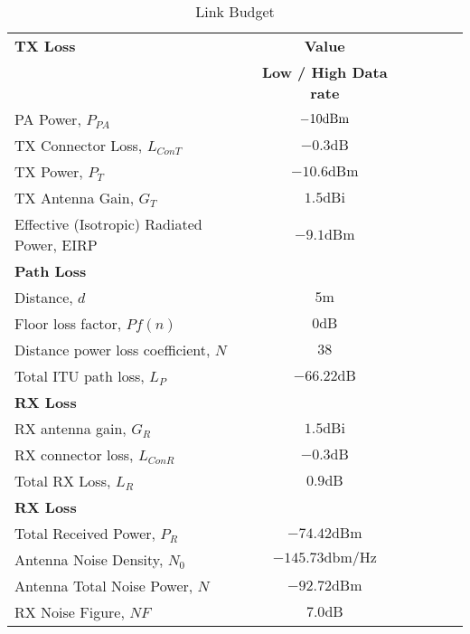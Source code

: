\begin{table}[htbp]
  \centering
  \caption{Link Budget}
    \begin{tabular}{lccccr}
    \rowcolor[rgb]{ 0,  0,  0} \textcolor[rgb]{ 1,  1,  1}{\textbf{TX Loss}}	& \textcolor[rgb]{ 1,  1,  1}{\textbf{Value}} 		\\
    \rowcolor[rgb]{ 0,  0,  0} \textcolor[rgb]{ 1,  1,  1}{} & \textcolor[rgb]{ 1,  1,  1}{\textbf{Low / High Data rate}} 		\\
    PA Power, $P_{PA}$ 						& $-10 \text{dBm}$										\\
    TX Connector Loss, $L_{ConT}$  				& $-0.3 \text{dB}$ 											\\
    TX Power, $P_T$ 							& $-10.6 \text{dBm}$											\\
    TX Antenna Gain, $G_T$ 					& $1.5 \text{dBi}$ 											\\
    Effective (Isotropic) Radiated Power, EIRP  		& $-9.1 \text{dBm}$										\\
    
    \rowcolor[rgb]{ 0,  0,  0} \textcolor[rgb]{ 1,  1,  1}{\textbf{Path Loss}}
    & \textcolor[rgb]{ 1,  1,  1}{\textbf{}} 															\\
    Distance, $d$  							& $5 \text{m}$ 											\\
    Floor loss factor, $Pf(n)$ 					& $0 \text{dB}$											\\
    Distance power loss coefficient, $N$ 			& $38$ 												\\
    Total ITU path loss, $L_P$ 					& $-66.22 \text{dB}$										\\
    
    \rowcolor[rgb]{ 0,  0,  0} \textcolor[rgb]{ 1,  1,  1}{\textbf{RX Loss}}	& \textcolor[rgb]{ 1,  1,  1}{\textbf{}} 			\\
    RX antenna gain, $G_R$					& $1.5 \text{dBi}$ 											\\
    RX connector loss, $L_{ConR}$ 				& $-0.3 \text{dB}$ 											\\
    Total RX Loss, $L_R$						& $0.9 \text{dB}$											\\
    
    \rowcolor[rgb]{ 0,  0,  0} \textcolor[rgb]{ 1,  1,  1}{\textbf{RX Loss}}	& \textcolor[rgb]{ 1,  1,  1}{\textbf{}} 			\\
    Total Received Power, $P_R$ 				& $-74.42 \text{dBm}$										\\
    Antenna Noise Density, $N_0$ 				& $-145.73 \text{dbm/Hz}$								\\
    Antenna Total Noise Power, $N$   				& $-92.72 \text{dBm}$										\\
    RX Noise Figure, $NF$ 					& $7.0 \text{dB}$									\\
        

\end{tabular}
\end{table}
